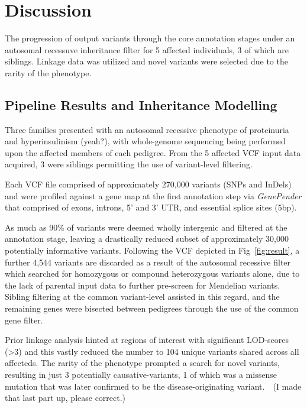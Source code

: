 \section{Discussion}

{The progression of output variants through the core annotation stages under an autosomal recessuve inheritance filter for 5 affected individuals, 3 of which are siblings. Linkage data was utilized and novel variants were selected due to the rarity of the phenotype.}


\subsection{Pipeline Results and Inheritance Modelling}

Three families presented with an autosomal recessive phenotype of proteinuria and hyperinsulinism (yeah?), with whole-genome sequencing being performed upon the affected members of each pedigree. From the 5 affected VCF input data acquired, 3 were siblings permitting the use of variant-level filtering.

Each VCF file comprised of approximately 270,000 variants (SNPs and InDels) and were profiled against a gene map at the first annotation step via \textit{GenePender} that comprised of exons, introns, 5' and 3' UTR, and essential splice sites (5bp).

As much as 90\% of variants were deemed wholly intergenic and filtered at the annotation stage, leaving a drastically reduced subset of approximately 30,000 potentially informative variants. Following the VCF depicted in Fig~\ref{fig:result}, a further 4,544 variants are discarded as a result of the autosomal recessive filter which searched for homozygous or compound heterozygous variants alone, due to the lack of parental input data to further pre-screen for Mendelian variants. Sibling filtering at the common variant-level assisted in this regard, and the remaining genes were bisected between pedigrees through the use of the common gene filter.

Prior linkage analysis hinted at regions of interest with significant LOD-scores (>3) and this vastly reduced the number to 104 unique variants shared across all affecteds. The rarity of the phenotype prompted a search for novel variants, resulting in just 3 potentially causative-variants, 1 of which was a missense mutation that was later confirmed to be the disease-originating variant.\
\
(I made that last part up, please correct.)


